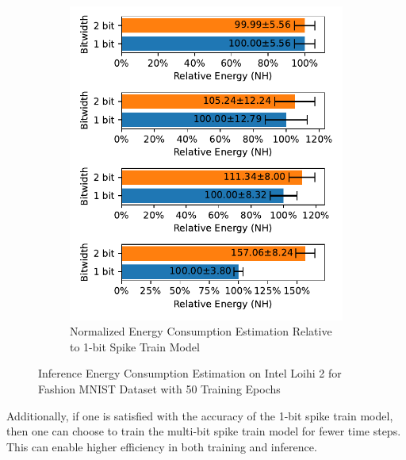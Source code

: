 \begin{figure}[!htpb]
\begin{subfigure}[H]{0.48\textwidth}
                \includegraphics[width=\textwidth]{../firerate/FashionMNIST/plots/fashionmnist_test_relative_energy_nh.pdf}
                \caption{Normalized Energy Consumption Estimation Relative to 1-bit Spike Train Model}
            \end{subfigure}
            \caption{Inference Energy Consumption Estimation on Intel Loihi 2 for Fashion MNIST Dataset with 50 Training Epochs}
            \label{fig:inference_energy_nh_firerate}
        \end{figure}

        Additionally, if one is satisfied with the accuracy of the 1-bit spike train model, then one can choose to train the multi-bit spike train model for fewer time steps. This can enable higher efficiency in both training and inference. 

